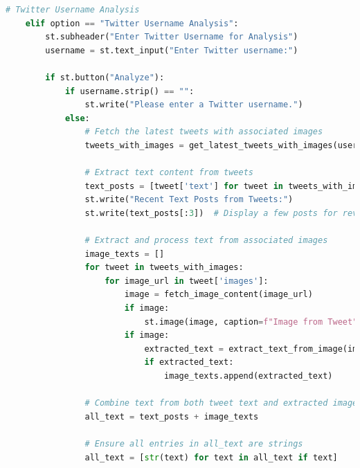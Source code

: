 \begin{tcolorbox}[colback=gray!5!white, colframe=gray!80!black, boxrule=0.5pt, title=Streamlit Mental Health Disorder Detection App]        
    \begin{lstlisting}[language=Python]
    # Twitter Username Analysis
    elif option == "Twitter Username Analysis":
        st.subheader("Enter Twitter Username for Analysis")
        username = st.text_input("Enter Twitter username:")
    
        if st.button("Analyze"):
            if username.strip() == "":
                st.write("Please enter a Twitter username.")
            else:
                # Fetch the latest tweets with associated images
                tweets_with_images = get_latest_tweets_with_images(username)
    
                # Extract text content from tweets
                text_posts = [tweet['text'] for tweet in tweets_with_images if tweet['text']]
                st.write("Recent Text Posts from Tweets:")
                st.write(text_posts[:3])  # Display a few posts for review
    
                # Extract and process text from associated images
                image_texts = []
                for tweet in tweets_with_images:
                    for image_url in tweet['images']:
                        image = fetch_image_content(image_url)
                        if image:
                            st.image(image, caption=f"Image from Tweet", use_column_width=True)
                        if image:
                            extracted_text = extract_text_from_image(image)  # Assuming a text extraction function is defined
                            if extracted_text:
                                image_texts.append(extracted_text)
    
                # Combine text from both tweet text and extracted image text
                all_text = text_posts + image_texts
    
                # Ensure all entries in all_text are strings
                all_text = [str(text) for text in all_text if text]
            \end{lstlisting}
        \end{tcolorbox}
